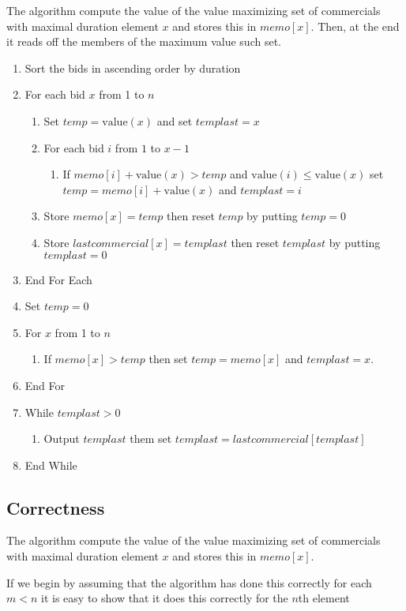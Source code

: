\documentclass{article}
\begin{document}
The algorithm compute the value of the value maximizing set of commercials with maximal duration element $x$ and stores this in $memo[x]$. Then, at the end it reads off the members of the maximum value such set.
\begin{enumerate}
\item Sort the bids in ascending order by duration
\item For each bid $x$ from 1 to $n$ 
\begin{enumerate}
\item Set $temp = \mathrm{value}(x)$ and set $templast=x$
\item For each bid $i$ from $1$ to $x-1$
\begin{enumerate}
\item If $memo[i]+\mathrm{value}(x)>temp$ and $\mathrm{value}(i)\leq\mathrm{value}(x)$ set  $temp=memo[i]+\mathrm{value}(x)$ and $templast=i$
\end{enumerate}
\item Store $memo[x]= temp$ then reset $temp$ by putting $temp=0$
\item Store $lastcommercial[x]=templast$ then reset $templast$ by putting $templast=0$
\end{enumerate}
\item End For Each
\item Set $temp=0$
\item For $x$ from 1 to $n$
\begin{enumerate}
\item  If $memo[x] > temp$ then set $temp=memo[x]$ and $templast=x$.
\end{enumerate}
\item End For
\item While $templast >0$
\begin{enumerate}
\item Output $templast$ them set $templast = lastcommercial[templast]$
\end{enumerate}
\item End While
\end{enumerate}
 
 
\subsection{Correctness}
The algorithm compute the value of the value maximizing set of commercials with maximal duration element $x$ and stores this in $memo[x]$.

If we begin by assuming that the algorithm has done this correctly for each $m<n$ it is easy to show that it does this correctly for the $n$th element
\end{document}
